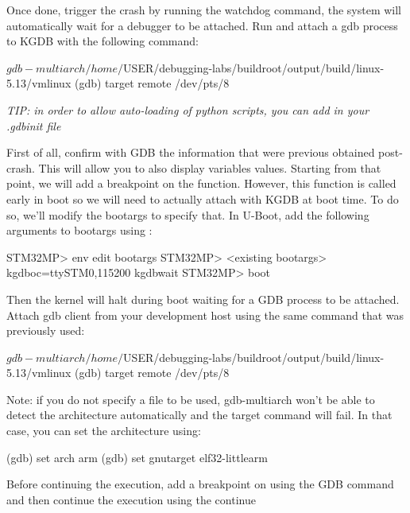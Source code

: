 Once done, trigger the crash by running the watchdog command, the system will
automatically wait for a debugger to be attached. Run  and
attach a gdb process to KGDB with the following command:

\begin{bashinput}
$ gdb-multiarch /home/$USER/debugging-labs/buildroot/output/build/linux-5.13/vmlinux
(gdb) target remote /dev/pts/8
\end{bashinput}

{\em TIP: in order to allow auto-loading of python scripts, you can add
 in your .gdbinit file}

First of all, confirm with GDB the information that were previous obtained
post-crash. This will allow you to also display variables values. Starting from that
point, we will add a breakpoint on the  function.
However, this function is called early in boot so we will need to actually
attach with KGDB at boot time. To do so, we'll modify the bootargs to specify
that. In U-Boot, add the following arguments to bootargs using :

\begin{bashinput}
STM32MP> env edit bootargs
STM32MP> <existing bootargs> kgdboc=ttySTM0,115200 kgdbwait
STM32MP> boot
\end{bashinput}

Then the kernel will halt during boot waiting for a GDB process to be attached.
Attach gdb client from your development host using the same command that was previously
used:

\begin{bashinput}
$ gdb-multiarch /home/$USER/debugging-labs/buildroot/output/build/linux-5.13/vmlinux
(gdb) target remote /dev/pts/8
\end{bashinput}

Note: if you do not specify a file to be used, gdb-multiarch won't be able to
detect the architecture automatically and the target command will fail. In that
case, you can set the architecture using:

\begin{bashinput}
(gdb) set arch arm
(gdb) set gnutarget elf32-littlearm
\end{bashinput}

Before continuing the execution, add a breakpoint on
 using the  GDB command and then
continue the execution using the continue 


